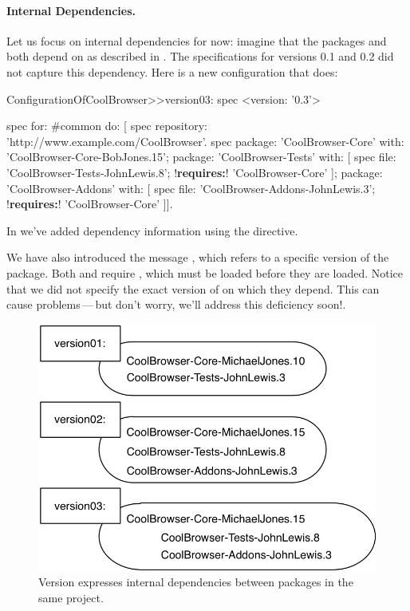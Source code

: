 \documentclass[a4paper,10pt,twoside]{book}
\begin{document}
\paragraph{Internal Dependencies.} Let us focus on internal dependencies for now: imagine that the packages  and  both depend on  as described in . The specifications for versions 0.1 and 0.2 did not capture this dependency. Here is a new configuration that does:

\begin{code}{}
ConfigurationOfCoolBrowser>>version03: spec 
       <version: '0.3'>
       
       spec for: #common do: [
              spec repository: 'http://www.example.com/CoolBrowser'.
              spec 
                     package: 'CoolBrowser-Core' with: 'CoolBrowser-Core-BobJones.15';
                     package: 'CoolBrowser-Tests' with: [
                            spec 
                                   file: 'CoolBrowser-Tests-JohnLewis.8';
                                   !\textbf{requires:}! 'CoolBrowser-Core' ];
                     package: 'CoolBrowser-Addons' with: [
                            spec 
                                   file: 'CoolBrowser-Addons-JohnLewis.3';
                                   !\textbf{requires:}! 'CoolBrowser-Core' ]].
\end{code}

\noindent
In  we've added dependency information using the  directive.

We have also introduced the  message , which refers to a specific version   of the package. Both  and   require , which must be loaded before they are loaded. 
Notice that we did not specify the exact version of  on which they depend.  This can cause problems\,---\,but don't worry, we'll address this deficiency soon!.

\begin{figure}
\begin{center}
\includegraphics[width=0.6\linewidth]{version03}
\caption{Version  expresses internal dependencies between packages in the same project.\label{fig:version03}}
\end{center}
\end{figure} 
\end{document}
